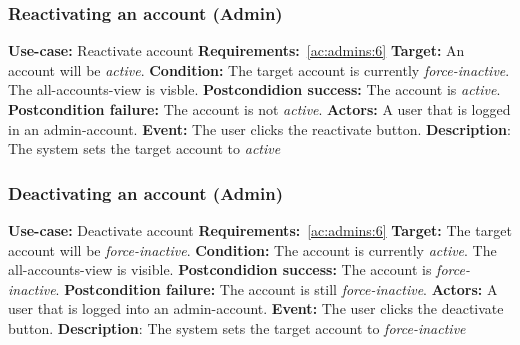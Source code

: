\subsubsection{Reactivating an account (Admin)}\label{subsubsec:reactivate-acc-admin}
\textbf{Use-case:} Reactivate account \newline
\textbf{Requirements:}~\ref{ac:admins:6} \newline
\textbf{Target:} An account will be \textit{active}. \newline
\textbf{Condition:} The target account is currently \textit{force-inactive}.
The all-accounts-view is visble. \newline
\textbf{Postcondidion success:} The account is \textit{active}. \newline
\textbf{Postcondition failure:} The account is not \textit{active}. \newline
\textbf{Actors:} A user that is logged in an admin-account. \newline
\textbf{Event:} The user clicks the reactivate button. \newline
\textbf{Description}: The system sets the target account to \textit{active}

\subsubsection{Deactivating an account (Admin)}\label{subsubsec:deactivate-acc-admin}
\textbf{Use-case:} Deactivate account \newline
\textbf{Requirements:}~\ref{ac:admins:6} \newline
\textbf{Target:} The target account will be \textit{force-inactive}. \newline
\textbf{Condition:} The account is currently \textit{active}.
The all-accounts-view is visible. \newline
\textbf{Postcondidion success:} The account is \textit{force-inactive}. \newline
\textbf{Postcondition failure:} The account is still \textit{force-inactive}. \newline
\textbf{Actors:} A user that is logged into an admin-account. \newline
\textbf{Event:} The user clicks the deactivate button. \newline
\textbf{Description}: The system sets the target account to \textit{force-inactive}


